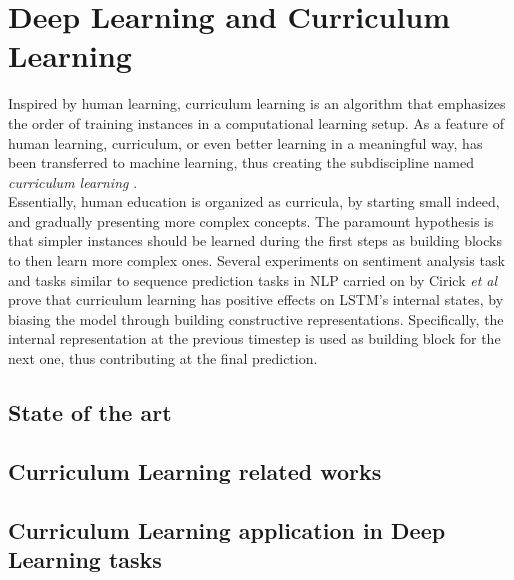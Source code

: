 \chapter{Deep Learning and Curriculum Learning}
Inspired by human learning, curriculum learning is an algorithm that emphasizes
the order of training instances in a computational learning setup.
As a feature of human learning, curriculum, or even better learning in a meaningful way,
has been transferred to machine learning, thus creating the subdiscipline named
\textit{curriculum learning} \cite{Wang2020}.\\
Essentially, human education is organized as curricula, by starting small indeed, and gradually presenting more complex
concepts. The paramount hypothesis is that simpler instances should be learned
during the first steps as building blocks to then learn more complex ones. Several experiments on sentiment 
analysis task and tasks similar to sequence prediction tasks in NLP carried on by Cirick \textit{et al} \cite{Cirik2016VisualizingAU} prove that
curriculum learning has positive effects on LSTM's internal states, by biasing the model through building constructive representations. 
Specifically, the internal representation at the previous timestep is used as building block for the next one, thus
contributing at the final prediction.


\section{State of the art}
\section{Curriculum Learning related works}
\section{Curriculum Learning application in Deep Learning tasks}




